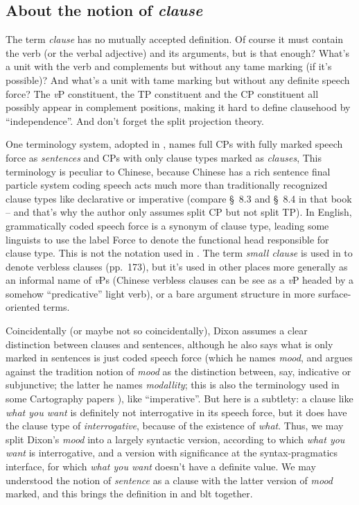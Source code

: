 \documentclass[UTF8, a4paper, oneside, scheme=plain]{ctexart}
\newcommand*{\citesec}[1]{\S~{#1}}
\newcommand*{\citepage}[1]{pp.~{#1}}
\newcommand*{\term}[1]{\emph{#1}}
\newcommand*{\corpus}[1]{\emph{#1}}
\newcommand*{\vP}{\textit{v}P}
\begin{document}
\subsection{About the notion of \term{clause}}

The term \term{clause} has no mutually accepted definition.
Of course it must contain the verb (or the verbal adjective)
and its arguments,
but is that enough?
What's a unit with the verb and complements but without any \ac{tame} marking
(if it's possible)?
And what's a unit with \ac{tame} marking but without any definite speech force? %
The \vP{} constituent, the TP constituent and the CP constituent 
all possibly appear in complement positions,
making it hard to define clausehood by ``independence''.
And don't forget the split projection theory.

One terminology system, 
adopted in \citep[\citepage{140}]{deng2010formal},
names full CPs with fully marked speech force as \term{sentences} 
and CPs with only clause types marked as \term{clauses},
This terminology is peculiar to Chinese,
because Chinese has a rich sentence final particle system 
coding speech acts much more than traditionally recognized clause types like declarative or imperative
(compare \citesec{8.3} and \citesec{8.4} in that book 
-- and that's why the author only assumes split CP but not split TP).
In English, grammatically coded speech force is a synonym of clause type,
leading some linguists to use the label Force to denote the functional head responsible for clause type.
This is not the notation used in \citet[\citepage{142}]{deng2010formal}.
The term \term{small clause} is used in \citet{deng2010formal} 
to denote verbless clauses (\citepage{173}),
but it's used in other places more generally as an informal name of \vP s
(Chinese verbless clauses can be see as a \vP{} headed by a somehow ``predicative'' light verb),
or a bare argument structure in more surface-oriented terms.

Coincidentally (or maybe not so coincidentally),
Dixon assumes a clear distinction between clauses and sentences,
although he also says what is only marked in sentences 
is just coded speech force 
(which he names \term{mood}, 
and argues against the tradition notion of \term{mood} as the distinction between, 
say, indicative or subjunctive;
the latter he names \term{modallity};
this is also the terminology used in some Cartography papers \citep{rizzi2016functional}),
like ``imperative''.
But here is a subtlety:
a clause like \corpus{what you want} is definitely not interrogative in its speech force,
but it does have the clause type of \term{interrogative},
because of the existence of \corpus{what}.
Thus, we may split Dixon's \term{mood} into a largely syntactic version,
according to which \corpus{what you want} is interrogative,
and a version with significance at the syntax-pragmatics interface,
for which \corpus{what you want} doesn't have a definite value.
We may understood the notion of \term{sentence} as a clause 
with the latter version of \term{mood} marked,
and this brings the definition in \citet{deng2010formal} and \ac{blt} together.
\end{document}
